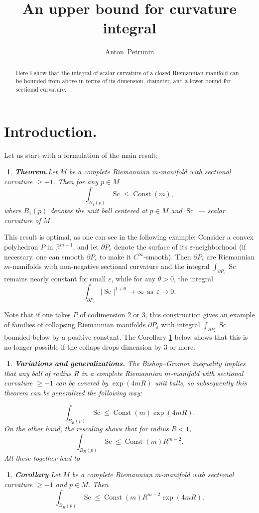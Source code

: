 \documentclass{article}
\def\RR{\mathbb{R}}
\def\eps{\varepsilon}
\def\ge{\geqslant}
\def\le{\leqslant}
\def\Const{\operatorname{Const}}
\def\Sc{\operatorname{Sc}}
\newtheorem{Nothing}[thm]{$\!\!\!$}
\newenvironment{nothing}{\begin{Nothing}\rm}{\end{Nothing}}
\begin{document}
\title{An upper bound for curvature integral}
\author{Anton~Petrunin}
\date{}
\maketitle

\begin{abstract}
Here I show that the integral of scalar curvature of a closed Riemannian manifold
can be bounded from above in terms of its dimension, diameter,
and a lower bound for sectional curvature.
\end{abstract}

\section{Introduction.}

Let us start with a formulation of the main result:

\begin{Nothing}{\bf Theorem.}\label{main}
Let $M$ be a complete Riemannian $m$-manifold with sectional curvature $\ge -1$.
Then for any $p\in M$
$$\int_{B_1(p)}\Sc\le \Const(m),$$
where $B_1(p)$ denotes the unit ball centered at $p\in M$ and $\Sc$ --- scalar curvature of $M$.
\end{Nothing}

This result is optimal, as one can see in the following example:
Consider a convex polyhedron $P$ in $\RR^{m+1}$, and let $\partial P_\eps$ denote the surface of its $\eps$-neighborhood (if necessary, one can smooth $\partial P_\eps$ to make it $C^\infty$-smooth).
Then $\partial P_\eps$ are Riemannian $m$-manifolds with non-negative sectional curvature and the integral
$\int_{\partial P_\eps}\Sc$
remains nearly constant for small $\eps$, while for any $\theta>0$, the integral $$\int_{\partial P_\eps}|\Sc|^{1+\theta}\to \infty\ \ \text{as}\ \  \eps\to 0.$$

Note that if one takes $P$ of codimension 2 or 3, this construction gives an example of families of collapsing Riemannian manifolds $\partial P_\eps$ with integral $\int_{\partial P_\eps}\Sc$ bounded below by a positive constant.
The Corollary \ref{cor} below shows that this is no longer possible if the collaps drops dimension by $3$ or more.

\begin{nothing}{\bf Variations and generalizations.}
The Bishop--Gromov inequality implies that any ball of radius $R$ in a complete Riemannian $m$-manifold with sectional curvature $\ge -1$ can be covered by $\exp(4m R)$ unit balls, so subsequently this theorem can be generalized the following way:

$$\int_{B_R(p)}\Sc\le \Const(m)\exp(4m R).$$
On the other hand, the rescaling shows that
for radius $R<1$,
$$\int_{B_R(p)}\Sc\le \Const(m)R^{m-2}.$$
All these together lead to
\end{nothing}
\begin{Nothing}{\bf Corollary} \label{cor} Let $M$ be a complete Riemannian
$m$-manifold with sectional curvature $\ge -1$ and $p\in M$.
Then $$\int_{B_R(p)}\Sc\le \Const(m)R^{m-2}\exp(4m R).$$
\end{Nothing}
\end{document}
